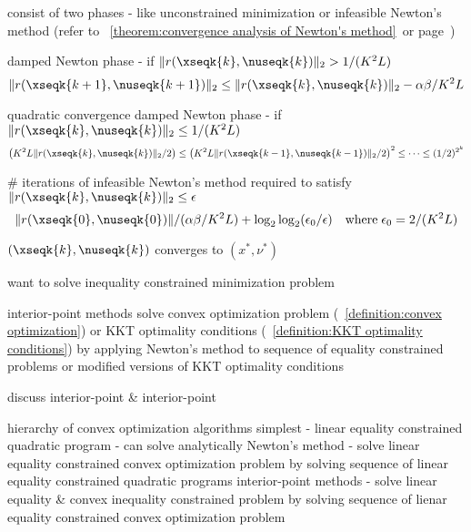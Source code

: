 \documentclass[17pt,landscape]{foils}
\begin{document}
{\item
	consist of two phases - like unconstrained minimization or infeasible Newton's method (refer to
	\theoremname~\ref{theorem:convergence analysis of Newton's method}\
	or page~\pageref{page:Convergence analysis of feasible Newton's method for equality constrained minimization})
	\bit
	\item
		damped Newton phase
		-
		if $\|r(\xseqk{k},\nuseqk{k})\|_2> 1/(K^2L)$
		$$
			\|r(\xseqk{k+1},\nuseqk{k+1})\|_2
			\leq
			\|r(\xseqk{k},\nuseqk{k})\|_2
			- \alpha \beta / K^2L
		$$
	\item
		quadratic convergence
		damped Newton phase
		-
		if $\|r(\xseqk{k},\nuseqk{k})\|_2 \leq 1/(K^2L)$
		$$
			\left( K^2L \|r(\xseqk{k},\nuseqk{k})\|_2 / 2 \right)
			\leq
			\left( K^2L \|r(\xseqk{k-1},\nuseqk{k-1})\|_2 / 2 \right)^2
			\leq
			\cdots
			\leq (1/2)^{2^k}
		$$
	\eit
\item
	\# iterations of infeasible Newton's method required to satisfy $\|r(\xseqk{k},\nuseqk{k})\|_2\leq\epsilon$
	$$
		\|r(\xseqk{0},\nuseqk{0})\| /(\alpha \beta / K^2L)
		+ \log_2 \log_2 (\epsilon_0/\epsilon) \quad \mbox{where}\; \epsilon_0 = 2/(K^2L)
	$$

\item
	$(\xseqk{k},\nuseqk{k})$ converges to $(x^\ast,\nu^\ast)$
\eit
\vfill




\bit
\item
	want to solve inequality constrained minimization problem

\vitem
	interior-point methods solve convex optimization problem (~\ref{definition:convex optimization})
	or KKT optimality conditions (\definitionname~\ref{definition:KKT optimality conditions})
	by
	\bit
	\vitem
		applying Newton's method to sequence of
		\bit
		\viitem
			equality constrained problems or
		\iitem
			modified versions of KKT optimality conditions
		\eit
	\eit

\vitem
	discuss interior-point  \& interior-point 

\vvitem
	hierarchy of convex optimization algorithms
	\bit
	\vitem
		simplest - linear equality constrained quadratic program - can solve analytically
	\vitem
		Newton's method - solve linear equality constrained convex optimization problem
		by solving sequence of linear equality constrained quadratic programs
	\vitem
		interior-point methods
		- solve linear equality \& convex inequality constrained problem
		by solving sequence of lienar equality constrained convex optimization problem
	\eit
\eit
\vfill


}
\end{document}
